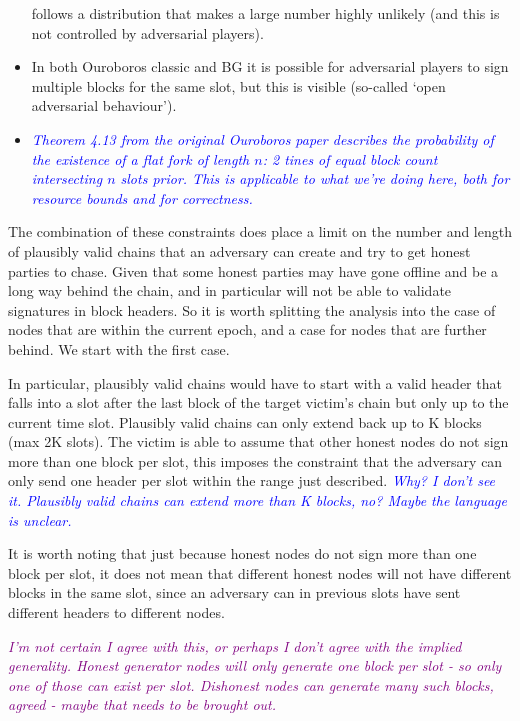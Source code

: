 \documentclass{article}
\newcommand{\njd}[1]{\textcolor{purple}{\emph{#1}}}
\newcommand{\avieth}[1]{\textcolor{blue}{\emph{#1}}}
\theoremstyle{definition}{
  \newtheorem{lemma}{Lemma}[section] %
  \newtheorem{definition}[lemma]{Definition}
}
\theoremstyle{theorem}{
  \newtheorem{invariant}[lemma]{Invariant}
  \newtheorem{proofobligation}[lemma]{Proof Obligation}
}
\numberwithin{equation}{lemma}
\begin{document}
\begin{itemize}
      follows a distribution that makes a large number highly unlikely (and
      this is not controlled by adversarial players).
\item In both Ouroboros classic and BG it is possible for adversarial players
      to sign multiple blocks for the same slot, but this is visible (so-called
      `open adversarial behaviour').
\item \avieth{Theorem 4.13 from the original Ouroboros paper describes the
      probability of the existence of a flat fork of length $n$: 2 tines of
      equal block count intersecting $n$ slots prior. This is applicable to
      what we're doing here, both for resource bounds and for correctness.}
\end{itemize}

The combination of these constraints does place a limit on the number and
length of plausibly valid chains that an adversary can create and try to get
honest parties to chase. Given that some honest parties may have gone offline
and be a long way behind the chain, and in particular will not be able to
validate signatures in block headers. So it is worth splitting the analysis
into the case of nodes that are within the current epoch, and a case for nodes
that are further behind. We start with the first case.

In particular, plausibly valid chains would have to start with a valid header
that falls into a slot after the last block of the target victim's chain
but only up to the current time slot. Plausibly valid chains can only extend
back up to K blocks (max 2K slots). The victim is able to assume that other
honest nodes do not sign more than one block per slot, this imposes the
constraint that the adversary can only send one header per slot within the
range just described.
\avieth{Why? I don't see it. Plausibly valid chains can extend more than
  K blocks, no? Maybe the language is unclear.}

It is worth noting that just because honest nodes do not sign more than one
block per slot, it does not mean that different honest nodes will not have
different blocks in the same slot, since an adversary can in previous slots
have sent different headers to different nodes.

\njd{\centering I'm not certain I agree with this, or perhaps I don't agree
  with the implied generality. Honest generator nodes will only generate one
  block per slot - so only one of those can exist per slot. Dishonest nodes can
  generate many such blocks, agreed - maybe that needs to be brought out.}
\end{document}
